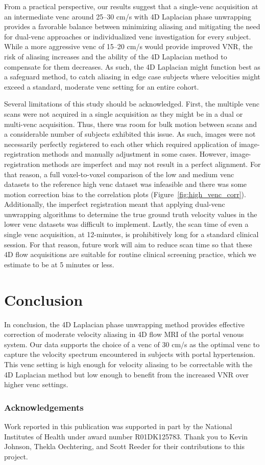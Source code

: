 From a practical perspective, our results suggest that a single-venc acquisition at an intermediate venc around 25--30 cm/s with 4D Laplacian phase unwrapping provides a favorable balance between minimizing aliasing and mitigating the need for dual-venc approaches or individualized venc investigation for every subject. While a more aggressive venc of 15--20 cm/s would provide improved VNR, the risk of aliasing increases and the ability of the 4D Laplacian method to compensate for them decreases. As such, the 4D Laplacian might function best as a safeguard method, to catch aliasing in edge case subjects where velocities might exceed a standard, moderate venc setting for an entire cohort.

Several limitations of this study should be acknowledged. First, the multiple venc scans were not acquired in a single acquisition as they might be in a dual or multi-venc acquisition. Thus, there was room for bulk motion between scans and a considerable number of subjects exhibited this issue. As such, images were not necessarily perfectly registered to each other which required application of image-registration methods and manually adjustment in some cases. However, image-registration methods are imperfect and may not result in a perfect alignment. For that reason, a full voxel-to-voxel comparison of the low and medium venc datasets to the reference high venc dataset was infeasible and there was some motion correction bias to the correlation plots (Figure~\ref{fig:high_venc_corr}). Additionally, the imperfect registration meant that applying dual-venc unwrapping algorithms to determine the true ground truth velocity values in the lower venc datasets was difficult to implement. Lastly, the scan time of even a single venc acquisition, at 12-minutes, is prohibitively long for a standard clinical session. For that reason, future work will aim to reduce scan time so that these 4D flow acquisitions are suitable for routine clinical screening practice, which we estimate to be at 5 minutes or less.

\section{Conclusion}\label{sec:gevenc_conclusion}
In conclusion, the 4D Laplacian phase unwrapping method provides effective correction of moderate velocity aliasing in 4D flow MRI of the portal venous system. Our data supports the choice of a venc of 30 cm/s as the optimal venc to capture the velocity spectrum encountered in subjects with portal hypertension. This venc setting is high enough for velocity aliasing to be correctable with the 4D Laplacian method but low enough to benefit from the increased VNR over higher venc settings. 

\subsubsection{Acknowledgements}
Work reported in this publication was supported in part by the National Institutes of Health under award number R01DK125783. Thank you to Kevin Johnson, Thekla Oechtering, and Scott Reeder for their contributions to this project.